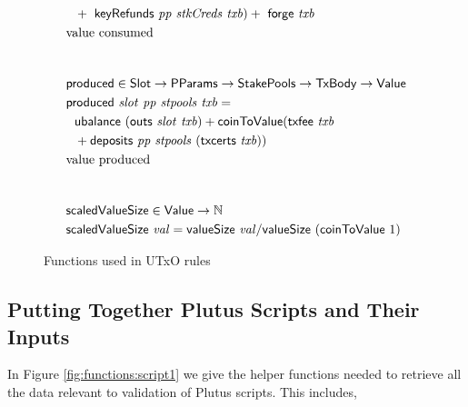 \begin{figure}[htb]
\begin{align*}
        &~~+~ \keyRefunds{pp}{stkCreds}{txb}) +
        ~\fun{forge}~\var{txb} \\
    & \text{value consumed} \\
    \nextdef
    & \fun{produced} \in \Slot \to \PParams \to \StakePools \to \TxBody \to \Value \\
    & \fun{produced}~\var{slot}~\var{pp}~\var{stpools}~\var{txb} = \\
    &~~\ubalance{(\outs{slot}~{txb})}  + \fun{coinToValue}(\txfee{txb} \\
    &~~+ \deposits{pp}{stpools}~{(\txcerts{txb})})\\
    & \text{value produced} \\
    \nextdef
    & \fun{scaledValueSize} \in \Value \to \N \\
    & \fun{scaledValueSize}~\var{val} = \fun{valueSize}~\var{val} / \fun{valueSize}~(\fun{coinToValue}~1) \\
  \end{align*}
  \caption{Functions used in UTxO rules}
  \label{fig:functions:utxo}
\end{figure}

\clearpage

\subsection{Putting Together Plutus Scripts and Their Inputs}
\label{sec:scripts-inputs}

In Figure \ref{fig:functions:script1} we give the helper functions needed to
retrieve all the data relevant to validation of Plutus scripts.
This includes,

